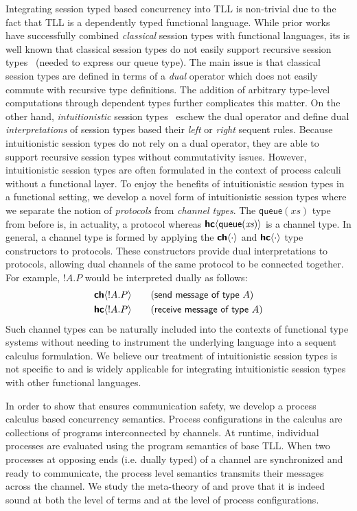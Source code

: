 Integrating session typed based concurrency into TLL is non-trivial due to the
fact that TLL is a dependently typed functional language. While prior
works~\cite{gay10,wadler12} have successfully combined \emph{classical} session
types with functional languages, its is well known that classical session types
do not easily support recursive session types~\cite{gay20} (needed to express
our \textsf{queue} type).  The main issue is that classical session types are
defined in terms of a \emph{dual} operator which does not easily commute with
recursive type definitions. The addition of arbitrary type-level computations
through dependent types further complicates this matter.  On the other hand,
\emph{intuitionistic} session types~\cite{caires10} eschew the dual operator and
define dual \emph{interpretations} of session types based their \emph{left} or
\emph{right} sequent rules.  Because intuitionistic session types do not rely on
a dual operator, they are able to support recursive session types without
commutativity issues. However, intuitionistic session types are often formulated
in the context of process calculi without a functional layer. To enjoy the
benefits of intuitionistic session types in a functional setting, we develop a
novel form of intuitionistic session types where we separate the notion of
\emph{protocols} from \emph{channel types}. The $\textsf{queue}(\textit{xs})$
type from before is, in actuality, a protocol whereas
${\textbf{\textsf{hc}}\langle{\textsf{queue}(\textit{xs})}\rangle}$ is a channel type. In general, a channel type
is formed by applying the ${\textbf{\textsf{ch}}\langle{\cdot}\rangle}$ and ${\textbf{\textsf{hc}}\langle{\cdot}\rangle}$ type constructors to
protocols. These constructors provide dual interpretations to protocols,
allowing dual channels of the same protocol to be connected together. For
example, $!A. P$ would be interpreted dually as follows:
\begin{alignat*}{2}
  &{\textbf{\textsf{ch}}\langle{!A. P}\rangle}\quad &&(\textsf{send message of type } A) \\
  &{\textbf{\textsf{hc}}\langle{!A. P}\rangle}\quad &&(\textsf{receive message of type } A)
\end{alignat*}
Such channel types can be naturally included into the contexts of functional
type systems without needing to instrument the underlying language into a
sequent calculus formulation.  We believe our treatment of intuitionistic
session types is not specific to \TLLC{} and is widely applicable for
integrating intuitionistic session types with other functional languages.

In order to show that \TLLC{} ensures communication safety, we develop a process
calculus based concurrency semantics. Process configurations in the calculus are
collections of \TLLC{} programs interconnected by channels. At runtime,
individual processes are evaluated using the program semantics of base TLL. When
two processes at opposing ends (i.e. dually typed) of a channel are synchronized
and ready to communicate, the process level semantics transmits their messages
across the channel. We study the meta-theory of \TLLC{} and prove that it is
indeed sound at both the level of terms and at the level of process
configurations.

